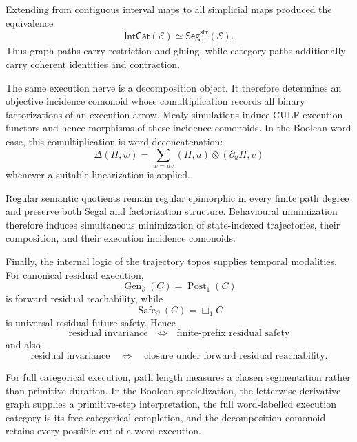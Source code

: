 Extending from contiguous interval maps to all simplicial maps produced the
equivalence
\[
    \mathsf{IntCat}(\mathcal E)
    \simeq
    \mathsf{Seg}^{\mathrm{str}}_+(\mathcal E).
\]
Thus graph paths carry restriction and gluing, while category paths
additionally carry coherent identities and contraction.

The same execution nerve is a decomposition object. It therefore determines
an objective incidence comonoid whose comultiplication records all binary
factorizations of an execution arrow. Mealy simulations induce CULF execution
functors and hence morphisms of these incidence comonoids. In the Boolean
word case, this comultiplication is word deconcatenation:
\[
    \Delta(H,w)
    =
    \sum_{w=uv}
    (H,u)\otimes(\partial_uH,v)
\]
whenever a suitable linearization is applied.

Regular semantic quotients remain regular epimorphic in every finite path
degree and preserve both Segal and factorization structure. Behavioural
minimization therefore induces simultaneous minimization of state-indexed
trajectories, their composition, and their execution incidence comonoids.

Finally, the internal logic of the trajectory topos supplies temporal
modalities. For canonical residual execution,
\[
    \operatorname{Gen}_{\partial}(C)
    =
    \operatorname{Post}_1(C)
\]
is forward residual reachability, while
\[
    \operatorname{Safe}_{\partial}(C)
    =
    \Box_1C
\]
is universal residual future safety. Hence
\[
    \text{residual invariance}
    \quad\Longleftrightarrow\quad
    \text{finite-prefix residual safety}
\]
and also
\[
    \text{residual invariance}
    \quad\Longleftrightarrow\quad
    \text{closure under forward residual reachability}.
\]

For full categorical execution, path length measures a chosen segmentation
rather than primitive duration. In the Boolean specialization, the
letterwise derivative graph supplies a primitive-step interpretation, the
full word-labelled execution category is its free categorical completion,
and the decomposition comonoid retains every possible cut of a word
execution.
